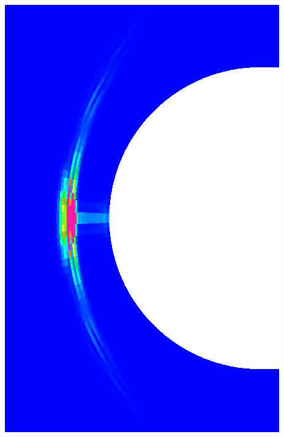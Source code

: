 \documentclass[mathserif]{beamer}
\begin{document}
\begin{frame}
\begin{columns}
\center
\includegraphics[width=.6\textwidth]{qoi_weighted_error}
\end{columns}
\end{frame}
\end{document}
